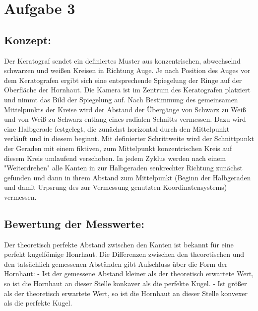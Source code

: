 \documentclass{../Vorlage/mat}
\begin{document}
\section*{Aufgabe 3}

\subsection{Konzept:}
Der Keratograf sendet ein definiertes Muster aus konzentrischen, abwechselnd schwarzen und weißen Kreisen in Richtung Auge. Je nach Position des Auges vor dem Keratografen ergibt sich eine entsprechende Spiegelung der Ringe auf der Oberfläche der Hornhaut. Die Kamera ist im Zentrum des Keratografen platziert und nimmt das Bild der Spiegelung auf. Nach Bestimmung des gemeinsamen Mittelpunkts der Kreise wird der Abstand der Übergänge von Schwarz zu Weiß und von Weiß zu Schwarz entlang eines radialen Schnitts vermessen. Dazu wird eine Halbgerade festgelegt, die zunächst horizontal durch den Mittelpunkt verläuft und in diesem beginnt. Mit definierter Schrittweite wird der Schnittpunkt der Geraden mit einem fiktiven, zum Mittelpunkt konzentrischen Kreis auf diesem Kreis umlaufend verschoben. In jedem Zyklus werden nach einem "Weiterdrehen" alle Kanten in zur Halbgeraden senkrechter Richtung zunächst gefunden und dann in ihrem Abstand zum Mittelpunkt (Beginn der Halbgeraden und damit Urpsrung des zur Vermessung genutzten Koordinatensystems) vermessen. 

\subsection{Bewertung der Messwerte:}
Der theoretisch perfekte Abstand zwischen den Kanten ist bekannt für eine perfekt kugelfömige Honrhaut. Die Differenzen zwischen den theoretischen und den tatsächlich gemessenen Abständen gibt Aufschluss über die Form der Hornhaut: 
- Ist der gemessene Abstand kleiner als der theoretisch erwartete Wert, so ist die Hornhaut an dieser Stelle konkaver als die perfekte Kugel.
- Ist größer als der theoretisch erwartete Wert, so ist die Hornhaut an dieser Stelle konvexer als die perfekte Kugel.
\end{document}
